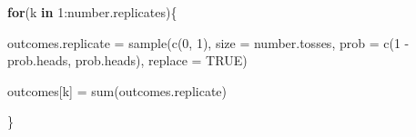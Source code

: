 \documentclass[
]{article}
\newenvironment{Shaded}{\begin{snugshade}}{\end{snugshade}}
\newcommand{\AttributeTok}[1]{\textcolor[rgb]{0.77,0.63,0.00}{#1}}
\newcommand{\ConstantTok}[1]{\textcolor[rgb]{0.00,0.00,0.00}{#1}}
\newcommand{\ControlFlowTok}[1]{\textcolor[rgb]{0.13,0.29,0.53}{\textbf{#1}}}
\newcommand{\DecValTok}[1]{\textcolor[rgb]{0.00,0.00,0.81}{#1}}
\newcommand{\FunctionTok}[1]{\textcolor[rgb]{0.00,0.00,0.00}{#1}}
\newcommand{\NormalTok}[1]{#1}
\newcommand{\OtherTok}[1]{\textcolor[rgb]{0.56,0.35,0.01}{#1}}
\newcommand{\SpecialCharTok}[1]{\textcolor[rgb]{0.00,0.00,0.00}{#1}}
\begin{document}
\begin{Shaded}
\begin{Highlighting}[]
\ControlFlowTok{for}\NormalTok{(k }\ControlFlowTok{in} \DecValTok{1}\SpecialCharTok{:}\NormalTok{number.replicates)\{}
  
\NormalTok{  outcomes.replicate }\OtherTok{=} \FunctionTok{sample}\NormalTok{(}\FunctionTok{c}\NormalTok{(}\DecValTok{0}\NormalTok{, }\DecValTok{1}\NormalTok{), }\AttributeTok{size =}\NormalTok{ number.tosses,}
                              \AttributeTok{prob =} \FunctionTok{c}\NormalTok{(}\DecValTok{1} \SpecialCharTok{{-}}\NormalTok{ prob.heads, prob.heads), }\AttributeTok{replace =} \ConstantTok{TRUE}\NormalTok{)}
  
\NormalTok{  outcomes[k] }\OtherTok{=} \FunctionTok{sum}\NormalTok{(outcomes.replicate)}
  
\NormalTok{\}}
\end{Highlighting}
\end{Shaded}
\end{document}
